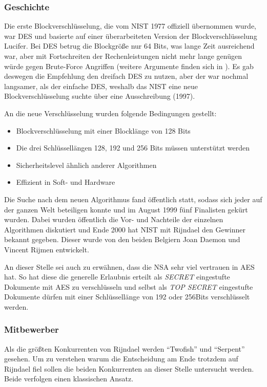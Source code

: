  \subsubsection{Geschichte}
 \label{aes-geschichte}
 Die erste Blockverschlüsselung, die vom \ac{NIST} 1977 offiziell übernommen wurde, war
 \ac{DES} und basierte auf einer überarbeiteten Version der Blockverschlüsselung Lucifer. Bei
 DES betrug die Blockgröße nur 64 Bits, was lange Zeit ausreichend war, aber mit Fortschreiten
 der Rechenleistungen nicht mehr lange genügen würde gegen Brute-Force Angriffen (weitere
 Argumente finden sich in \cite{paar10}). Es gab deswegen die Empfehlung den dreifach DES zu
 nutzen, aber der war nochmal langsamer, als der einfache DES, weshalb das NIST eine neue
 Blockverschlüsselung suchte über eine Ausschreibung (1997).
 
 An die neue Verschlüsselung wurden folgende Bedingungen gestellt:
\begin{itemize}
 \item Blockverschlüsselung mit einer Blocklänge von 128 Bits
 \item Die drei Schlüssellängen 128, 192 und 256 Bits müssen unterstützt werden
 \item Sicherheitslevel ähnlich anderer Algorithmen
 \item Effizient in Soft- und Hardware
\end{itemize} 

Die Suche nach dem neuen Algorithmus fand öffentlich statt, sodass sich jeder auf der ganzen
Welt beteiligen konnte und im August 1999 fünf Finalisten gekürt wurden. Dabei wurden
öffentlich die Vor- und Nachteile der einzelnen Algorithmen diskutiert und Ende 2000 hat NIST
mit Rijndael den Gewinner bekannt gegeben. Dieser wurde von den beiden Belgiern Joan
Daemon und Vincent Rijmen entwickelt.

An dieser Stelle sei auch zu erwähnen, dass die \ac{NSA} sehr viel vertrauen in AES hat. So hat
diese die generelle Erlaubnis erteilt als \emph{SECRET} eingestufte Dokumente mit AES zu
verschlüsseln und selbst als \emph{TOP SECRET} eingestufte Dokumente dürfen mit einer
Schlüssellänge von 192 oder 256Bits verschlüsselt werden. \cite{paar10}
 
 \subsubsection{Mitbewerber}
 Als die größten Konkurrenten von Rijndael werden ``Twofish'' und ``Serpent'' gesehen. Um zu verstehen
 warum die Entscheidung am Ende trotzdem auf Rijndael fiel sollen die beiden Konkurrenten an dieser
 Stelle untersucht werden. Beide verfolgen einen klassischen Ansatz.
 
